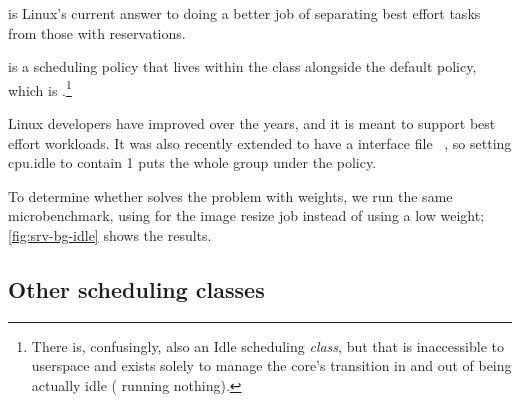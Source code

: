 \schedidle{} is Linux's current answer to doing a better job of separating best
effort tasks from those with reservations.

\schedidle{} is a scheduling policy that lives within the \normalclass{} class
alongside the default policy, which is \schednormal{}.\footnote{There is,
confusingly, also an Idle scheduling \textit{class}, but that is inaccessible to
userspace and exists solely to manage the core's transition in and out of being
actually idle (\ie{} running nothing).} 

Linux developers have improved \schedidle{} over the years, and it is meant to
support best effort workloads. It was also recently extended to have a
\cgroups{} interface file ~\cite{lkml-idle-cgroup}, so setting cpu.idle to
contain 1 puts the whole group under the \schedidle{} policy.

To determine whether \schedidle{} solves the problem with \cgroups{} weights, we
run the same microbenchmark, using \schedidle{} for the image resize job instead
of using a low \cgroups{} weight; \autoref{fig:srv-bg-idle} shows the results.


\subsection{Other scheduling classes}


